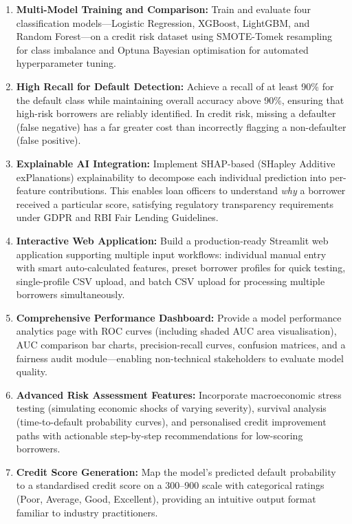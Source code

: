 \documentclass[12pt,a4paper]{report}
\begin{document}
\begin{enumerate}[label=\arabic*.]
    \item \textbf{Multi-Model Training and Comparison:} Train and evaluate four classification models---Logistic Regression, XGBoost, LightGBM, and Random Forest---on a credit risk dataset using SMOTE-Tomek resampling for class imbalance and Optuna Bayesian optimisation for automated hyperparameter tuning.

    \item \textbf{High Recall for Default Detection:} Achieve a recall of at least 90\% for the default class while maintaining overall accuracy above 90\%, ensuring that high-risk borrowers are reliably identified. In credit risk, missing a defaulter (false negative) has a far greater cost than incorrectly flagging a non-defaulter (false positive).

    \item \textbf{Explainable AI Integration:} Implement SHAP-based (SHapley Additive exPlanations) explainability to decompose each individual prediction into per-feature contributions. This enables loan officers to understand \emph{why} a borrower received a particular score, satisfying regulatory transparency requirements under GDPR and RBI Fair Lending Guidelines.

    \item \textbf{Interactive Web Application:} Build a production-ready Streamlit web application supporting multiple input workflows: individual manual entry with smart auto-calculated features, preset borrower profiles for quick testing, single-profile CSV upload, and batch CSV upload for processing multiple borrowers simultaneously.

    \item \textbf{Comprehensive Performance Dashboard:} Provide a model performance analytics page with ROC curves (including shaded AUC area visualisation), AUC comparison bar charts, precision-recall curves, confusion matrices, and a fairness audit module---enabling non-technical stakeholders to evaluate model quality.

    \item \textbf{Advanced Risk Assessment Features:} Incorporate macroeconomic stress testing (simulating economic shocks of varying severity), survival analysis (time-to-default probability curves), and personalised credit improvement paths with actionable step-by-step recommendations for low-scoring borrowers.

    \item \textbf{Credit Score Generation:} Map the model's predicted default probability to a standardised credit score on a 300--900 scale with categorical ratings (Poor, Average, Good, Excellent), providing an intuitive output format familiar to industry practitioners.
\end{enumerate}
\end{document}
